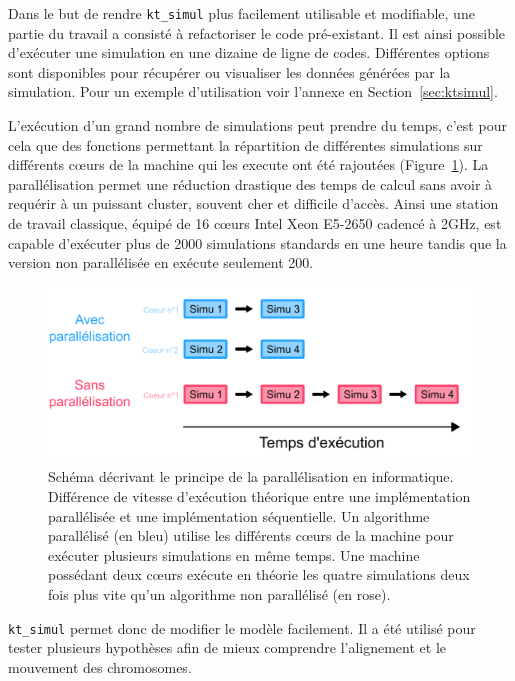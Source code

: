 \documentclass[12pt,a4paper,twoside,openright]{book}
\begin{document}
Dans le but de rendre \texttt{kt\_simul} plus facilement utilisable et
modifiable, une partie du travail a consisté à refactoriser le code
pré-existant. Il est ainsi possible d'exécuter une simulation en une
dizaine de ligne de codes. Différentes options sont disponibles pour
récupérer ou visualiser les données générées par la simulation. Pour un
exemple d'utilisation voir l'annexe en Section~\ref{sec:ktsimul}.

L'exécution d'un grand nombre de simulations peut prendre du temps,
c'est pour cela que des fonctions permettant la répartition de
différentes simulations sur différents cœurs de la machine qui les
execute ont été rajoutées (Figure~\ref{fig:parallel}). La
parallélisation permet une réduction drastique des temps de calcul sans
avoir à requérir à un puissant cluster, souvent cher et difficile
d'accès. Ainsi une station de travail classique, équipé de 16 cœurs
Intel Xeon E5-2650 cadencé à 2GHz, est capable d'exécuter plus de 2000
simulations standards en une heure tandis que la version non
parallélisée en exécute seulement 200.

\begin{figure}[htbp]
\centering
\includegraphics{figures/results/modelling/parallel.png}
\caption[Schéma décrivant le principe de la parallélisation en informatique]{\label{fig:parallel}Schéma
décrivant le principe de la parallélisation en informatique. Différence
de vitesse d'exécution théorique entre une implémentation parallélisée
et une implémentation séquentielle. Un algorithme parallélisé (en bleu)
utilise les différents cœurs de la machine pour exécuter plusieurs
simulations en même temps. Une machine possédant deux cœurs exécute en
théorie les quatre simulations deux fois plus vite qu'un algorithme non
parallélisé (en rose).}
\end{figure}

\texttt{kt\_simul} permet donc de modifier le modèle facilement. Il a
été utilisé pour tester plusieurs hypothèses afin de mieux comprendre
l'alignement et le mouvement des chromosomes.
\end{document}

